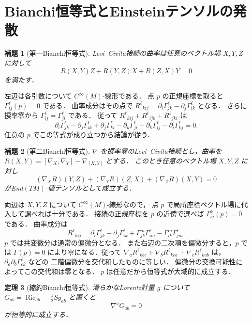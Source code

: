 \documentclass[a5paper,10pt,onecolumn]{jsarticle}
\makeatletter
\theoremstyle{mathnotetheorem}
\newtheorem{theorem}{定理}[section]
\newtheorem{lemma}[theorem]{補題}
\renewcommand{\proofname}{証明}
\renewenvironment{proof}[1][\proofname]{%
  \par\pushQED{\qed}\normalfont\topsep4\p@\@plus2\p@\relax
  \trivlist\item[\hskip\labelsep\bfseries #1]\ignorespaces
}{\popQED\endtrivlist\@endpefalse}
\makeatother
\begin{document}
\section{Bianchi恒等式とEinsteinテンソルの発散}
\begin{lemma}[第一Bianchi恒等式]
Levi--Civita接続の曲率は任意のベクトル場 $X,Y,Z$ に対して
\[
 R(X,Y)Z+R(Y,Z)X+R(Z,X)Y=0
\]
を満たす．
\end{lemma}
\begin{proof}
左辺は各引数について $C^\infty(M)$-線形である．
点 $p$ の正規座標を取ると $\Gamma^\ell_{ij}(p)=0$ である．
曲率成分はその点で
$R^\ell{}_{kij}=\partial_i\Gamma^\ell_{jk}
-\partial_j\Gamma^\ell_{ik}$ となる．
さらに捩率零から $\Gamma^\ell_{ij}=\Gamma^\ell_{ji}$ である．
従って $R^\ell{}_{kij}+R^\ell{}_{ijk}+R^\ell{}_{jki}$ は
\[
 \partial_i\Gamma^\ell_{jk}-\partial_j\Gamma^\ell_{ik}
 +\partial_j\Gamma^\ell_{ki}-\partial_k\Gamma^\ell_{ji}
 +\partial_k\Gamma^\ell_{ij}-\partial_i\Gamma^\ell_{kj}=0.
\]
任意の $p$ でこの等式が成り立つから結論が従う．
\end{proof}
\begin{lemma}[第二Bianchi恒等式]
$\nabla$ を捩率零のLevi--Civita接続とし，曲率を
$R(X,Y)=[\nabla_X,\nabla_Y]-\nabla_{[X,Y]}$ とする．
このとき任意のベクトル場 $X,Y,Z$ に対し
\[
 (\nabla_XR)(Y,Z)+(\nabla_YR)(Z,X)
 +(\nabla_ZR)(X,Y)=0
\]
がEnd$(TM)$-値テンソルとして成立する．
\end{lemma}
\begin{proof}
両辺は $X,Y,Z$ について $C^\infty(M)$-線形なので，
点 $p$ で局所座標ベクトル場に代入して調べれば十分である．
接続の正規座標を $p$ の近傍で選べば $\Gamma^k_{ij}(p)=0$ である．
曲率成分は
\[
 R^\ell{}_{kij}=\partial_i\Gamma^\ell_{jk}
 -\partial_j\Gamma^\ell_{ik}
 +\Gamma^m_{jk}\Gamma^\ell_{im}
 -\Gamma^m_{ik}\Gamma^\ell_{jm}.
\]
$p$ では共変微分は通常の偏微分となる．
また右辺の二次項を偏微分すると，$p$ では
$\Gamma(p)=0$ により零になる．従って
$\nabla_aR^\ell{}_{kbc}+\nabla_bR^\ell{}_{kca}
 +\nabla_cR^\ell{}_{kab}$ は，
$\partial_a\partial_b\Gamma^\ell_{ck}$ などの
二階偏微分を交代和したものに等しい．
偏微分の交換可能性によってこの交代和は零となる．
$p$ は任意だから恒等式が大域的に成立する．
\end{proof}
\begin{theorem}[縮約Bianchi恒等式]
滑らかなLorentz計量 $g$ について
$G_{ab}=\operatorname{Ric}_{ab}-\frac12Sg_{ab}$ と置くと
\[
 \nabla^aG_{ab}=0
\]
が恒等的に成立する．
\end{theorem}
\end{document}
